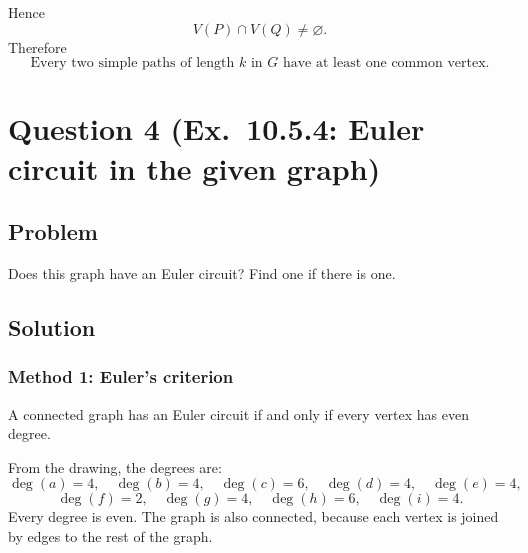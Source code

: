 \documentclass[12pt]{article}
\begin{document}
Hence
\[
V(P)\cap V(Q)\neq\varnothing.
\]
Therefore
\[
\boxed{\text{Every two simple paths of length }k\text{ in }G\text{ have at least one common vertex.}}
\]
\section{Question 4 (Ex.\ 10.5.4: Euler circuit in the given graph)}

\subsection{Problem}
Does this graph have an Euler circuit? Find one if there is one.

\begin{center}
\end{center}

\subsection{Solution}

\subsubsection{Method 1: Euler's criterion}
A connected graph has an Euler circuit if and only if every vertex has even degree.

From the drawing, the degrees are:
\[
\deg(a)=4,\quad \deg(b)=4,\quad \deg(c)=6,\quad \deg(d)=4,\quad \deg(e)=4,
\]
\[
\deg(f)=2,\quad \deg(g)=4,\quad \deg(h)=6,\quad \deg(i)=4.
\]
Every degree is even. The graph is also connected, because each vertex is joined by edges to the rest of the graph.
\end{document}
